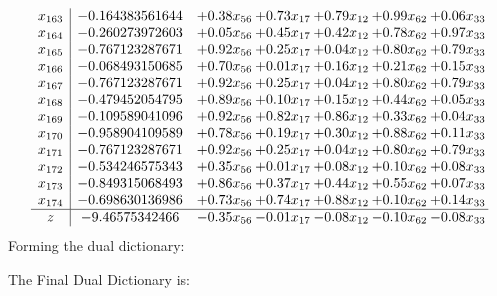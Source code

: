 \documentclass[8pt]{article}
\begin{document}
\[\begin{array}{c| c c@{\hskip 2pt} c@{\hskip 2pt} c@{\hskip 2pt} c@{\hskip 2pt} c@{\hskip 2pt} }
 x_{163}   &  -0.164383561644 & +  0.38 x_{56} & +  0.73 x_{17} & +  0.79 x_{12} & +  0.99 x_{62} & +  0.06 x_{33}\\
 x_{164}   &  -0.260273972603 & +  0.05 x_{56} & +  0.45 x_{17} & +  0.42 x_{12} & +  0.78 x_{62} & +  0.97 x_{33}\\
 x_{165}   &  -0.767123287671 & +  0.92 x_{56} & +  0.25 x_{17} & +  0.04 x_{12} & +  0.80 x_{62} & +  0.79 x_{33}\\
 x_{166}   &  -0.068493150685 & +  0.70 x_{56} & +  0.01 x_{17} & +  0.16 x_{12} & +  0.21 x_{62} & +  0.15 x_{33}\\
 x_{167}   &  -0.767123287671 & +  0.92 x_{56} & +  0.25 x_{17} & +  0.04 x_{12} & +  0.80 x_{62} & +  0.79 x_{33}\\
 x_{168}   &  -0.479452054795 & +  0.89 x_{56} & +  0.10 x_{17} & +  0.15 x_{12} & +  0.44 x_{62} & +  0.05 x_{33}\\
 x_{169}   &  -0.109589041096 & +  0.92 x_{56} & +  0.82 x_{17} & +  0.86 x_{12} & +  0.33 x_{62} & +  0.04 x_{33}\\
 x_{170}   &  -0.958904109589 & +  0.78 x_{56} & +  0.19 x_{17} & +  0.30 x_{12} & +  0.88 x_{62} & +  0.11 x_{33}\\
 x_{171}   &  -0.767123287671 & +  0.92 x_{56} & +  0.25 x_{17} & +  0.04 x_{12} & +  0.80 x_{62} & +  0.79 x_{33}\\
 x_{172}   &  -0.534246575343 & +  0.35 x_{56} & +  0.01 x_{17} & +  0.08 x_{12} & +  0.10 x_{62} & +  0.08 x_{33}\\
 x_{173}   &  -0.849315068493 & +  0.86 x_{56} & +  0.37 x_{17} & +  0.44 x_{12} & +  0.55 x_{62} & +  0.07 x_{33}\\
 x_{174}   &  -0.698630136986 & +  0.73 x_{56} & +  0.74 x_{17} & +  0.88 x_{12} & +  0.10 x_{62} & +  0.14 x_{33}\\
\hline
z    &  -9.46575342466 & -0.35 x_{56} & -0.01 x_{17} & -0.08 x_{12} & -0.10 x_{62} & -0.08 x_{33}\\
\end{array}\]
Forming the dual dictionary:

The Final Dual Dictionary is: 
\end{document}
